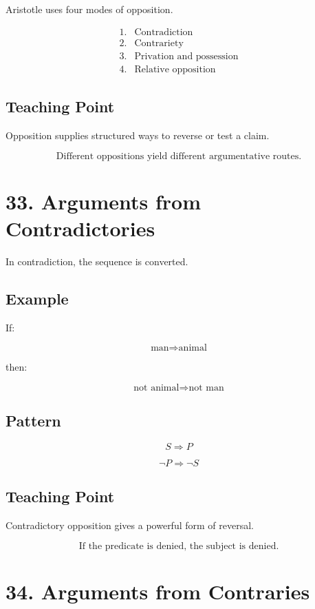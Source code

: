 \documentclass[12pt]{article}
\begin{document}
Aristotle uses four modes of opposition.

\[
\begin{array}{ll}
1. & \text{Contradiction} \\
2. & \text{Contrariety} \\
3. & \text{Privation and possession} \\
4. & \text{Relative opposition}
\end{array}
\]

\subsection*{Teaching Point}

Opposition supplies structured ways to reverse or test a claim.

\[
\boxed{
\text{Different oppositions yield different argumentative routes.}
}
\]

\section*{33. Arguments from Contradictories}

In contradiction, the sequence is converted.

\subsection*{Example}

If:

\[
\text{man} \Rightarrow \text{animal}
\]

then:

\[
\text{not animal} \Rightarrow \text{not man}
\]

\subsection*{Pattern}

\[
S \Rightarrow P
\]

\[
\neg P \Rightarrow \neg S
\]

\subsection*{Teaching Point}

Contradictory opposition gives a powerful form of reversal.

\[
\boxed{
\text{If the predicate is denied, the subject is denied.}
}
\]

\section*{34. Arguments from Contraries}
\end{document}
